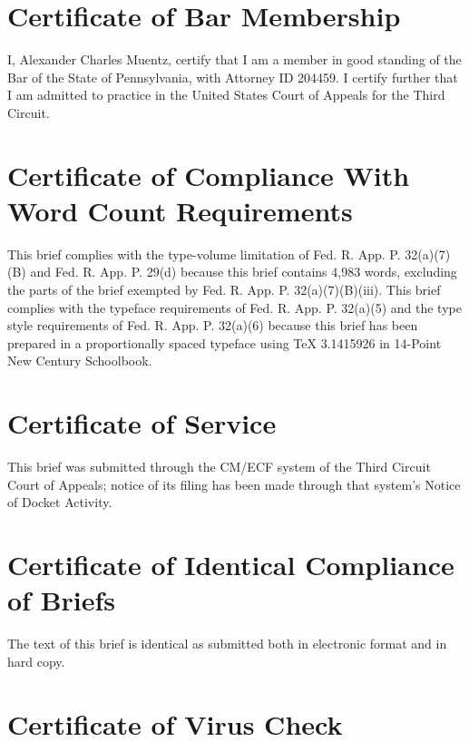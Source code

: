 \documentclass{article}
\begin{document}
	\newpage
	
	\section{Certificate of Bar Membership}
	
	I, Alexander Charles Muentz, certify that I am a member in good standing of the Bar of the State of Pennsylvania, with Attorney ID 204459. I certify further that I am admitted to practice in the United States Court of Appeals for the Third Circuit.
	
	\section{Certificate of Compliance With Word Count Requirements}
	
	This brief complies with the type-volume limitation of Fed. R. App. P. 32(a)(7)(B)  and Fed. R. App. P. 29(d) because this brief contains 4,983 words, excluding the parts of the brief exempted by Fed. R. App. P. 32(a)(7)(B)(iii). This brief complies with the typeface requirements of Fed. R. App. P. 32(a)(5) and the type style requirements of Fed. R. App. P. 32(a)(6) because this brief has been prepared in a proportionally spaced typeface using TeX 3.1415926 in 14-Point New Century Schoolbook.
	
	\section{Certificate of Service}
	
	This brief was submitted through the CM/ECF system of the Third Circuit Court of Appeals; notice of its filing has been made through that system's Notice of Docket Activity.
	
	\section{Certificate of Identical Compliance of Briefs}
	
	The text of this brief is identical as submitted both in electronic format and in hard copy.
	
	\section{Certificate of Virus Check}
	
\end{document}
